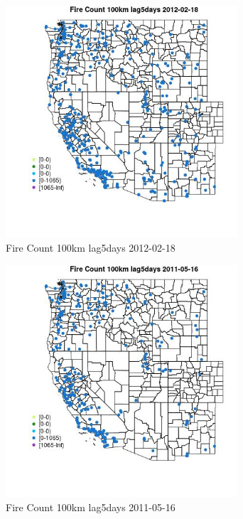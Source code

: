 \begin{figure} 
\centering  
\includegraphics[width=0.77\textwidth]{Code_Outputs/Report_ML_input_PM25_Step4_part_f_de_duplicated_aves_prioritize_24hr_obswNAs_MapObsFire_Count_100km_lag5days2012-02-18.jpg} 
\caption{\label{fig:Report_ML_input_PM25_Step4_part_f_de_duplicated_aves_prioritize_24hr_obswNAsMapObsFire_Count_100km_lag5days2012-02-18}Fire Count 100km lag5days 2012-02-18} 
\end{figure} 
 

\begin{figure} 
\centering  
\includegraphics[width=0.77\textwidth]{Code_Outputs/Report_ML_input_PM25_Step4_part_f_de_duplicated_aves_prioritize_24hr_obswNAs_MapObsFire_Count_100km_lag5days2011-05-16.jpg} 
\caption{\label{fig:Report_ML_input_PM25_Step4_part_f_de_duplicated_aves_prioritize_24hr_obswNAsMapObsFire_Count_100km_lag5days2011-05-16}Fire Count 100km lag5days 2011-05-16} 
\end{figure} 
 

